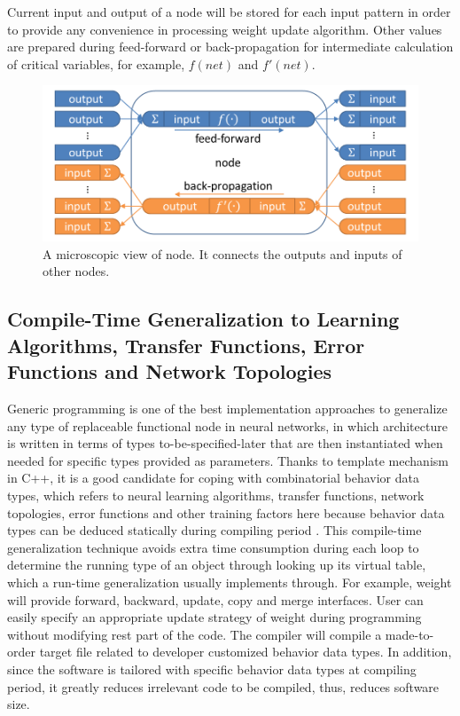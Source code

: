\documentclass[procedia]{easychair}
\begin{document}
Current input and output of a node will be stored for each input pattern in order to provide any convenience in processing weight update algorithm.  Other values are prepared during feed-forward or back-propagation for intermediate calculation of critical variables, for example, $f(net)$ and $f'(net)$.

\begin{figure}[tb]
    \begin{centering}
        \includegraphics[scale=0.5]{../../pic/microscopic.png}
        \caption{A microscopic view of node.  It connects the outputs and inputs of other nodes.}
        \label{fig:microscopic}
	\end{centering}
\end{figure}

\subsection{Compile-Time Generalization to Learning Algorithms, Transfer Functions, Error Functions and Network Topologies}

Generic programming is one of the best implementation approaches to generalize any type of replaceable functional node in neural networks, in which architecture is written in terms of types to-be-specified-later \cite{wiki:generic_programming} that are then instantiated when needed for specific types provided as parameters.  Thanks to template mechanism in C++, it is a good candidate for coping with combinatorial behavior data types, which refers to neural learning algorithms, transfer functions, network topologies, error functions and other training factors here because behavior data types can be deduced statically during compiling period \cite{alexandrescu2001preface}.  This compile-time generalization technique avoids extra time consumption during each loop to determine the running type of an object through looking up its virtual table, which a run-time generalization usually implements through.  For example, weight will provide forward, backward, update, copy and merge interfaces.  User can easily specify an appropriate update strategy of weight during programming without modifying rest part of the code.  The compiler will compile a made-to-order target file related to developer customized behavior data types.  In addition, since the software is tailored with specific behavior data types at compiling period, it greatly reduces irrelevant code to be compiled, thus, reduces software size.
\end{document}
